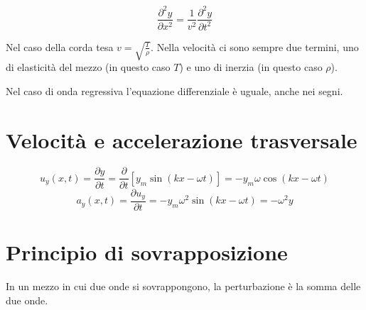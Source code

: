 \begin{equation}
\frac{\partial^2 y}{\partial x^2}=\frac{1}{v^2}\frac{\partial^2 y}{\partial t^2}
\end{equation}

Nel caso della corda tesa $v=\sqrt{\frac{T}{\rho}}$. Nella velocità ci sono sempre due termini, uno di elasticità del mezzo (in questo caso $T$) e uno di inerzia (in questo caso $\rho$).

Nel caso di onda regressiva l'equazione differenziale è uguale, anche nei segni.
\section{Velocità e accelerazione trasversale}
\[u_y(x,t)=\frac{\partial y}{\partial t}=\frac{\partial}{\partial t}\left[y_m\sin\left(kx-\omega t\right)\right]=-y_m\omega\cos\left(kx-\omega t\right)\]
\[a_y(x,t)=\frac{\partial u_y}{\partial t}=-y_m\omega^2\sin\left(kx-\omega t\right)=-\omega^2 y\]
\section{Principio di sovrapposizione}
\begin{Pri}[sovrapposizione]
In un mezzo in cui due onde si sovrappongono, la perturbazione è la somma delle due onde.
\end{Pri}
